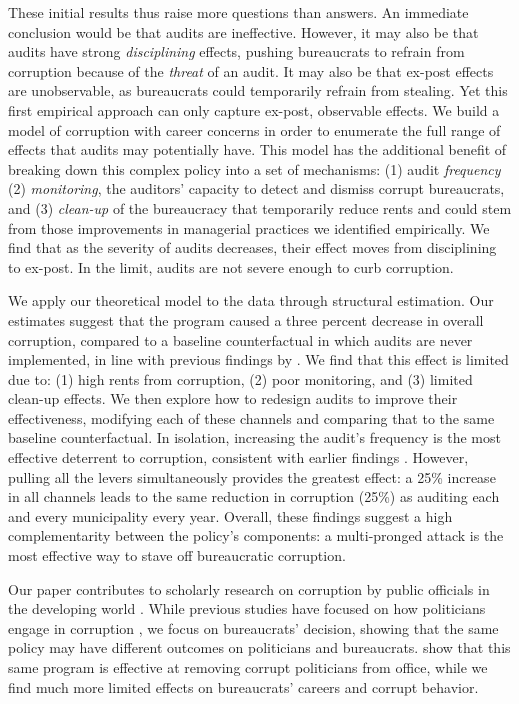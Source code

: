 \documentclass[12pt,a4paper]{article}
\theoremstyle{definition}
\begin{document}
These initial results thus raise more questions than answers. An immediate conclusion would be that audits are ineffective. However, it may also be that audits have strong \emph{disciplining} effects, pushing bureaucrats to refrain from corruption because of the \emph{threat} of an audit. It may also be that ex-post effects are unobservable, as bureaucrats could temporarily refrain from stealing. Yet this first empirical approach can only capture ex-post, observable effects. We build a model of corruption with career concerns in order to enumerate the full range of effects that audits may potentially have. This model has the additional benefit of breaking down this complex policy into a set of mechanisms: (1) audit \emph{frequency} (2) \emph{monitoring}, the auditors' capacity to detect and dismiss corrupt bureaucrats, and (3) \emph{clean-up} of the bureaucracy that temporarily reduce rents and could stem from those improvements in managerial practices we identified empirically. We find that as the severity of audits decreases, their effect moves from disciplining to ex-post. In the limit, audits are not severe enough to curb corruption.

We apply our theoretical model to the data through structural estimation. Our estimates suggest that the program caused a three percent decrease in overall corruption, compared to a baseline counterfactual in which audits are never implemented, in line with previous findings by \citet{avis_government_2018}. We find that this effect is limited due to: (1) high rents from corruption, (2) poor monitoring, and (3) limited clean-up effects. We then explore how to redesign audits to improve their effectiveness, modifying each of these channels and comparing that to the same baseline counterfactual. In isolation, increasing the audit's frequency is the most effective deterrent to corruption, consistent with earlier findings \citep{olken_monitoring_2007,bobonis2016,zamboni_audit_2018}. However, pulling all the levers simultaneously provides the greatest effect: a 25\% increase in all channels leads to the same reduction in corruption (25\%) as auditing each and every municipality every year. Overall, these findings suggest a high complementarity between the policy's components: a multi-pronged attack is the most effective way to stave off bureaucratic corruption.

Our paper contributes to scholarly research on corruption by public officials in the developing world \citep{treisman2007have, olken_corruption_2012}. While previous studies have focused on how politicians engage in corruption \citep{nyblade2008cheats, ferraz_electoral_2011,bobonis2016}, we focus on bureaucrats' decision, showing that the same policy may have different outcomes on politicians and bureaucrats. \citet{ferraz_electoral_2011} show that this same program is effective at removing corrupt politicians from office, while we find much more limited effects on bureaucrats' careers and corrupt behavior. 
\end{document}
